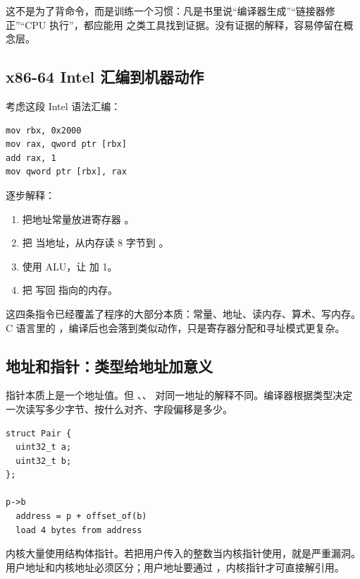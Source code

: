 \begin{rubricbox}
这不是为了背命令，而是训练一个习惯：凡是书里说“编译器生成”“链接器修正”“CPU 执行”，都应能用  之类工具找到证据。没有证据的解释，容易停留在概念层。
\end{rubricbox}

\subsection{x86-64 Intel 汇编到机器动作}

考虑这段 Intel 语法汇编：

\begin{lstlisting}
mov rbx, 0x2000
mov rax, qword ptr [rbx]
add rax, 1
mov qword ptr [rbx], rax
\end{lstlisting}

逐步解释：

\begin{enumerate}
\tightlist
\item {} 把地址常量放进寄存器 。
\item {} 把  当地址，从内存读 8 字节到 。
\item {} 使用 ALU，让  加 1。
\item {} 把  写回  指向的内存。
\end{enumerate}

这四条指令已经覆盖了程序的大部分本质：常量、地址、读内存、算术、写内存。C 语言里的 ，编译后也会落到类似动作，只是寄存器分配和寻址模式更复杂。

\subsection{地址和指针：类型给地址加意义}

指针本质上是一个地址值。但 、、 对同一地址的解释不同。编译器根据类型决定一次读写多少字节、按什么对齐、字段偏移是多少。

\begin{lstlisting}
struct Pair {
  uint32_t a;
  uint32_t b;
};

p->b
  address = p + offset_of(b)
  load 4 bytes from address
\end{lstlisting}

内核大量使用结构体指针。若把用户传入的整数当内核指针使用，就是严重漏洞。用户地址和内核地址必须区分；用户地址要通过 ，内核指针才可直接解引用。

